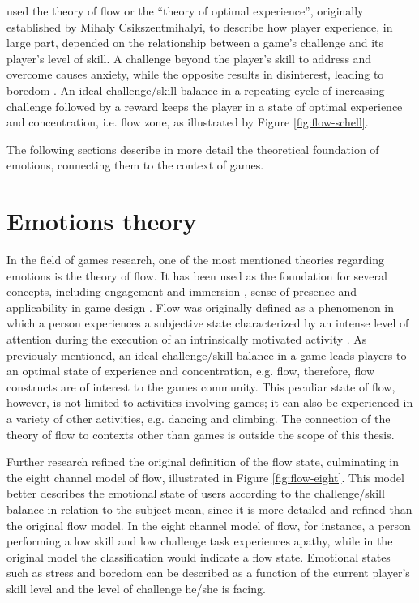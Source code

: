 \textcite{chen2007flow} used the theory of flow or the ``theory of optimal experience'', originally established by Mihaly Csikszentmihalyi, to describe how player experience, in large part, depended on the relationship between a game's challenge and its player's level of skill. A challenge beyond the player's skill to address and overcome causes anxiety, while the opposite results in disinterest, leading to boredom \parencite{chen2007flow}. An ideal challenge/skill balance in a repeating cycle of increasing challenge followed by a reward keeps the player in a state of optimal experience and concentration, i.e. flow zone, as illustrated by Figure \ref{fig:flow-schell}.

The following sections describe in more detail the theoretical foundation of emotions, connecting them to the context of games.

\section{Emotions theory}

In the field of games research, one of the most mentioned theories regarding emotions is the theory of flow. It has been used as the foundation for several concepts, including engagement and immersion \parencite{brown2004grounded}, sense of presence \parencite{weibel2011immersion} and applicability in game design \parencite{sweetser2005gameflow, chen2007flow, cruz2017player}. Flow was originally defined as a phenomenon in which a person experiences a subjective state characterized by an intense level of attention during the execution of an intrinsically motivated activity \parencite{nakamura2014concept}. As previously mentioned, an ideal challenge/skill balance in a game leads players to an optimal state of experience and concentration, e.g. flow, therefore, flow constructs are of interest to the games community. This peculiar state of flow, however, is not limited to activities involving games; it can also be experienced in a variety of other activities, e.g. dancing and climbing. The connection of the theory of flow to contexts other than games is outside the scope of this thesis.

Further research \parencite{nakamura2014concept} refined the original definition of the flow state, culminating in the eight channel model of flow, illustrated in Figure \ref{fig:flow-eight}. This model better describes the emotional state of users according to the challenge/skill balance in relation to the subject mean, since it is more detailed and refined than the original flow model. In the eight channel model of flow, for instance, a person performing a low skill and low challenge task experiences apathy, while in the original model the classification would indicate a flow state. Emotional states such as stress and boredom can be described as a function of the current player's skill level and the level of challenge he/she is facing.

